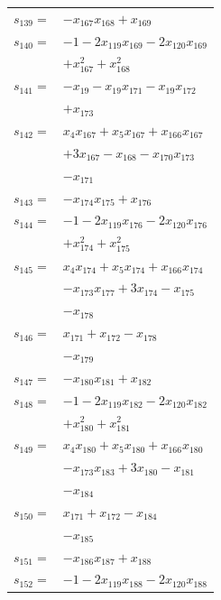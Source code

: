 \begin{longtable}{@{}r@{\;}l@{}}
\(s_{139}=\) & \(\displaystyle -x_{167}x_{168} +x_{169}\) \\[3pt]
\(s_{140}=\) & \(\displaystyle -1 -2x_{119}x_{169} -2x_{120}x_{169}\) \\
 & \(\displaystyle +x_{167}^{2} +x_{168}^{2}\) \\[3pt]
\(s_{141}=\) & \(\displaystyle -x_{19} -x_{19}x_{171} -x_{19}x_{172}\) \\
 & \(\displaystyle +x_{173}\) \\[3pt]
\(s_{142}=\) & \(\displaystyle x_{4}x_{167} +x_{5}x_{167} +x_{166}x_{167}\) \\
 & \(\displaystyle +3x_{167} -x_{168} -x_{170}x_{173}\) \\
 & \(\displaystyle -x_{171}\) \\[3pt]
\(s_{143}=\) & \(\displaystyle -x_{174}x_{175} +x_{176}\) \\[3pt]
\(s_{144}=\) & \(\displaystyle -1 -2x_{119}x_{176} -2x_{120}x_{176}\) \\
 & \(\displaystyle +x_{174}^{2} +x_{175}^{2}\) \\[3pt]
\(s_{145}=\) & \(\displaystyle x_{4}x_{174} +x_{5}x_{174} +x_{166}x_{174}\) \\
 & \(\displaystyle -x_{173}x_{177} +3x_{174} -x_{175}\) \\
 & \(\displaystyle -x_{178}\) \\[3pt]
\(s_{146}=\) & \(\displaystyle x_{171} +x_{172} -x_{178}\) \\
 & \(\displaystyle -x_{179}\) \\[3pt]
\(s_{147}=\) & \(\displaystyle -x_{180}x_{181} +x_{182}\) \\[3pt]
\(s_{148}=\) & \(\displaystyle -1 -2x_{119}x_{182} -2x_{120}x_{182}\) \\
 & \(\displaystyle +x_{180}^{2} +x_{181}^{2}\) \\[3pt]
\(s_{149}=\) & \(\displaystyle x_{4}x_{180} +x_{5}x_{180} +x_{166}x_{180}\) \\
 & \(\displaystyle -x_{173}x_{183} +3x_{180} -x_{181}\) \\
 & \(\displaystyle -x_{184}\) \\[3pt]
\(s_{150}=\) & \(\displaystyle x_{171} +x_{172} -x_{184}\) \\
 & \(\displaystyle -x_{185}\) \\[3pt]
\(s_{151}=\) & \(\displaystyle -x_{186}x_{187} +x_{188}\) \\[3pt]
\(s_{152}=\) & \(\displaystyle -1 -2x_{119}x_{188} -2x_{120}x_{188}\) \\

\end{longtable}

